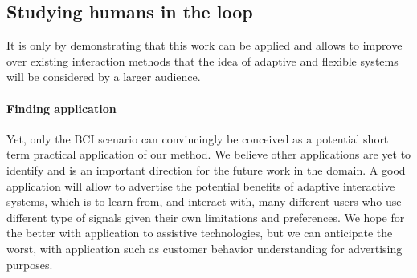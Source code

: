 


\subsection*{Studying humans in the loop}
\label{chapter:limitations:userstudies}


It is only by demonstrating that this work can be applied and allows to improve over existing interaction methods that the idea of adaptive and flexible systems will be considered by a larger audience.

\paragraph{Finding application} Yet, only the BCI scenario can convincingly be conceived as a potential short term practical application of our method. We believe other applications are yet to identify and is an important direction for the future work in the domain. A good application will allow to advertise the potential benefits of adaptive interactive systems, which is to learn from, and interact with, many different users who use different type of signals given their own limitations and preferences. We hope for the better with application to assistive technologies, but we can anticipate the worst, with application such as customer behavior understanding for advertising purposes.





